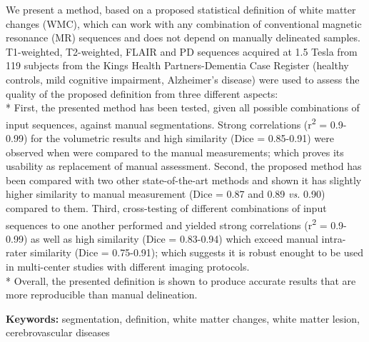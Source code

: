 We present a method, based on a proposed statistical definition of white matter changes (WMC), which can work with any combination of conventional magnetic resonance (MR) sequences and does not depend on manually delineated samples. T1-weighted, T2-weighted, FLAIR and PD sequences acquired at 1.5 Tesla from 119 subjects from the Kings Health Partners-Dementia Case Register (healthy controls, mild cognitive impairment, Alzheimer’s disease) were used to assess the quality of the proposed definition from three different aspects:
\\*
First, the presented method has been tested, given all possible combinations of input sequences, against manual segmentations. Strong correlations (r\textsuperscript{2} = 0.9-0.99) for the volumetric results and high similarity (Dice = 0.85-0.91) were observed when were compared to the manual measurements; which proves its usability as replacement of manual assessment.
Second, the proposed method has been compared with two other state-of-the-art methods and shown it has slightly higher similarity to manual measurement (Dice = 0.87 and 0.89 \textit{vs.} 0.90) compared to them.
Third, cross-testing of different combinations of input sequences to one another performed and yielded strong correlations (r\textsuperscript{2} = 0.9-0.99) as well as high similarity (Dice = 0.83-0.94) which exceed manual intra-rater similarity (Dice = 0.75-0.91); which suggests it is robust enought to be used in multi-center studies with different imaging protocols.
\\*
Overall, the presented definition is shown to produce accurate results that are more reproducible than manual delineation.

\textbf{Keywords:} segmentation, definition, white matter changes, white matter lesion, cerebrovascular diseases

  
  
  
  
  
  
  